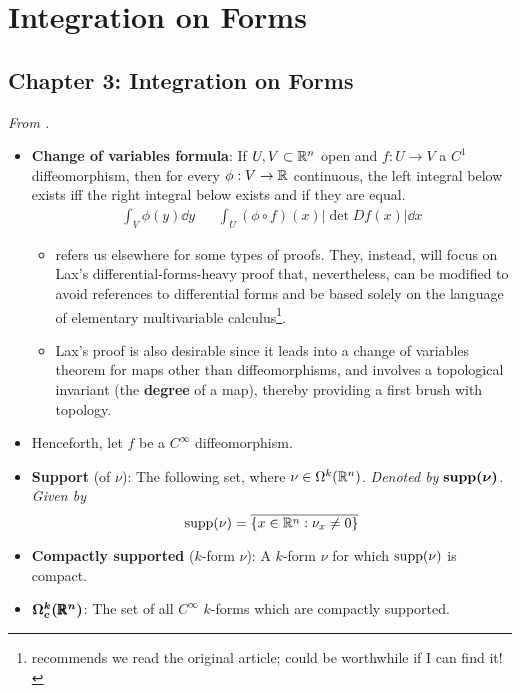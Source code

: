 \documentclass[../notes.tex]{subfiles}
\begin{document}
\chapter{Integration on Forms}
\section{Chapter 3: Integration on Forms}
\emph{From \textcite{bib:DifferentialForms}.}
\begin{itemize}
    \item {}\textbf{Change of variables formula}: If $U,V\subset\R^n$ open and $f:U\to V$ a $C^1$ diffeomorphism, then for every $\phi:V\to\R$ continuous, the left integral below exists iff the right integral below exists and if they are equal.
    \begin{align*}
        \int_V\phi(y)\dd{y}&&
        \int_U(\phi\circ f)(x)|\det Df(x)|\dd{x}
    \end{align*}
    \begin{itemize}
        \item \textcite{bib:DifferentialForms} refers us elsewhere for some types of proofs. They, instead, will focus on Lax's differential-forms-heavy proof that, nevertheless, can be modified to avoid references to differential forms and be based solely on the language of elementary multivariable calculus\footnote{\textcite{bib:DifferentialForms} recommends we read the original article; could be worthwhile if I can find it!}.
        \item Lax's proof is also desirable since it leads into a change of variables theorem for maps other than diffeomorphisms, and involves a topological invariant (the \textbf{degree} of a map), thereby providing a first brush with topology.
    \end{itemize}
    \item Henceforth, let $f$ be a $C^\infty$ diffeomorphism.
    \item \textbf{Support} (of $\nu$): The following set, where $\nu\in\ome[k]{\R^n}$. \emph{Denoted by} $\bm{\supp(\nu)}$. \emph{Given by}
    \begin{equation*}
        \supp(\nu) = \overline{\{x\in\R^n:\nu_x\neq 0\}}
    \end{equation*}
    \item \textbf{Compactly supported} ($k$-form $\nu$): A $k$-form $\nu$ for which $\supp(\nu)$ is compact.
    \item $\bm{\Omega_c^k(\pmb{\R}^n)}$: The set of all $C^\infty$ $k$-forms which are compactly supported.

\end{itemize}
\end{document}
